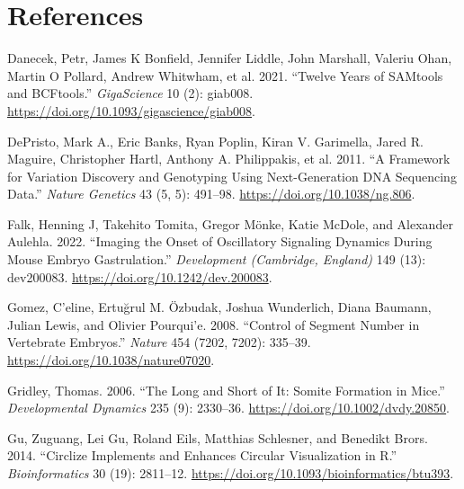 \documentclass[
]{book}
\newlength{\cslhangindent}
\newlength{\cslentryspacingunit} %
\newenvironment{CSLReferences}[2] %
 {%
  \setlength{\parindent}{0pt}
  \ifodd #1
  \let\oldpar\par
  \def\par{\hangindent=\cslhangindent\oldpar}
  \fi
  \setlength{\parskip}{#2\cslentryspacingunit}
 }%
 {}
\begin{document}
\hypertarget{references}{%
\chapter*{References}\label{references}}

\hypertarget{refs}{}
\begin{CSLReferences}{1}{0}
\leavevmode{}%
Danecek, Petr, James K Bonfield, Jennifer Liddle, John Marshall, Valeriu Ohan, Martin O Pollard, Andrew Whitwham, et al. 2021. {``Twelve Years of {SAMtools} and {BCFtools}.''} \emph{GigaScience} 10 (2): giab008. \url{https://doi.org/10.1093/gigascience/giab008}.

\leavevmode{}%
DePristo, Mark A., Eric Banks, Ryan Poplin, Kiran V. Garimella, Jared R. Maguire, Christopher Hartl, Anthony A. Philippakis, et al. 2011. {``A Framework for Variation Discovery and Genotyping Using Next-Generation {DNA} Sequencing Data.''} \emph{Nature Genetics} 43 (5, 5): 491--98. \url{https://doi.org/10.1038/ng.806}.

\leavevmode{}%
Falk, Henning J, Takehito Tomita, Gregor Mönke, Katie McDole, and Alexander Aulehla. 2022. {``Imaging the Onset of Oscillatory Signaling Dynamics During Mouse Embryo Gastrulation.''} \emph{Development (Cambridge, England)} 149 (13): dev200083. \url{https://doi.org/10.1242/dev.200083}.

\leavevmode{}%
Gomez, C'eline, Ertuğrul M. Özbudak, Joshua Wunderlich, Diana Baumann, Julian Lewis, and Olivier Pourqui'e. 2008. {``Control of Segment Number in Vertebrate Embryos.''} \emph{Nature} 454 (7202, 7202): 335--39. \url{https://doi.org/10.1038/nature07020}.

\leavevmode{}%
Gridley, Thomas. 2006. {``The Long and Short of It: {Somite} Formation in Mice.''} \emph{Developmental Dynamics} 235 (9): 2330--36. \url{https://doi.org/10.1002/dvdy.20850}.

\leavevmode{}%
Gu, Zuguang, Lei Gu, Roland Eils, Matthias Schlesner, and Benedikt Brors. 2014. {``Circlize Implements and Enhances Circular Visualization in {R}.''} \emph{Bioinformatics} 30 (19): 2811--12. \url{https://doi.org/10.1093/bioinformatics/btu393}.


\end{CSLReferences}
\end{document}
